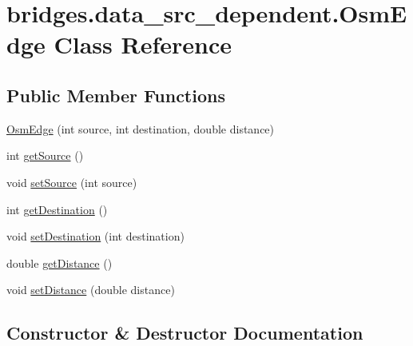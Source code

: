 \hypertarget{classbridges_1_1data__src__dependent_1_1_osm_edge}{}\section{bridges.\+data\+\_\+src\+\_\+dependent.\+Osm\+Edge Class Reference}
\label{classbridges_1_1data__src__dependent_1_1_osm_edge}
\subsection*{Public Member Functions}
\begin{DoxyCompactItemize}
\item 
\hyperlink{classbridges_1_1data__src__dependent_1_1_osm_edge_a87b1d4efb3d94d8109b18f29882475f6}{Osm\+Edge} (int source, int destination, double distance)
\item 
int \hyperlink{classbridges_1_1data__src__dependent_1_1_osm_edge_a4ffc915a30144db8e3c1521772a6a26d}{get\+Source} ()
\item 
void \hyperlink{classbridges_1_1data__src__dependent_1_1_osm_edge_aa61fb02ce746b89c26c71cd2f20053e7}{set\+Source} (int source)
\item 
int \hyperlink{classbridges_1_1data__src__dependent_1_1_osm_edge_a9695950217254c113eada4019d647977}{get\+Destination} ()
\item 
void \hyperlink{classbridges_1_1data__src__dependent_1_1_osm_edge_a0bfcd0bd6dc7a4e97a078a67e41df445}{set\+Destination} (int destination)
\item 
double \hyperlink{classbridges_1_1data__src__dependent_1_1_osm_edge_a0bad934b9b643d5d0e375eb4210601a5}{get\+Distance} ()
\item 
void \hyperlink{classbridges_1_1data__src__dependent_1_1_osm_edge_afe9d2fa452c89d08d7c1a23ff3302c62}{set\+Distance} (double distance)
\end{DoxyCompactItemize}


\subsection{Constructor \& Destructor Documentation}
\mbox{\label{classbridges_1_1data__src__dependent_1_1_osm_edge_a87b1d4efb3d94d8109b18f29882475f6}} 
